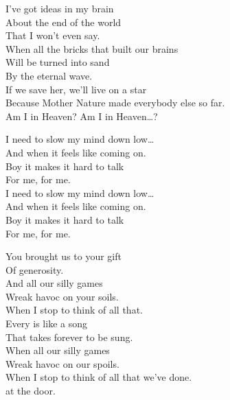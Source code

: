 I've got ideas in my brain \\
About the end of the world \\
That I won't even say. \\
When all the bricks that built our brains \\
Will be turned into sand \\
By the eternal wave. \\

If we save her, we'll live on a star \\
Because Mother Nature made everybody else so far. \\

Am I in Heaven? Am I in Heaven…?





I need to slow my mind down low… \\

And when it feels like coming on. \\
Boy it makes it hard to talk \\
For me, for me. \\

I need to slow my mind down low… \\

And when it feels like coming on. \\
Boy it makes it hard to talk \\
For me, for me. \\





You brought us to your gift \\
Of generosity. \\
And all our silly games \\
Wreak havoc on your soils. \\
When I stop to think of all that. \\

Every  is like a song \\
That takes forever to be sung. \\
When all our silly games \\
Wreak havoc on our spoils. \\
When I stop to think of all that we've done. \\
 at the door. \\

